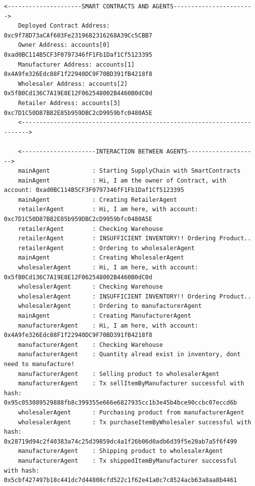 \begin{itemize}
    \vspace{.5cm}
    \begin{lstlisting}[caption={Agent Interaction (Scenario 3)},label={Scenario3}, numbers=none, basicstyle=\ttfamily\tiny]
    <---------------------SMART CONTRACTS AND AGENTS----------------------->
    Deployed Contract Address: 0xc9f78D73aCAf603Fe2319682316268A39Cc5CBB7
    Owner Address: accounts[0] 0xad0BC114B5CF3F0797346fF1Fb1Daf1Cf5123395
    Manufacturer Address: accounts[1] 0x4A9fe326Edc88F1f22940DC9F70BD391fB4218f8
    Wholesaler Address: accounts[2] 0x5fB0Cd136C7A19E8E12F062548002B4460B0dC0d
    Retailer Address: accounts[3] 0xc7D1C50D87B82E85b959DBC2cD9959bfc0480A5E
    <------------------------------------------------------------------------>
    
    <---------------------INTERACTION BETWEEN AGENTS-------------------->
    mainAgent            : Starting SupplyChain with SmartContracts
    mainAgent            : Hi, I am the owner of Contract, with account: 0xad0BC114B5CF3F0797346fF1Fb1Daf1Cf5123395
    mainAgent            : Creating RetailerAgent
    retailerAgent        : Hi, I am here, with account: 0xc7D1C50D87B82E85b959DBC2cD9959bfc0480A5E
    retailerAgent        : Checking Warehouse
    retailerAgent        : INSUFFICIENT INVENTORY!! Ordering Product..
    retailerAgent        : Ordering to wholesalerAgent
    mainAgent            : Creating WholesalerAgent
    wholesalerAgent      : Hi, I am here, with account: 0x5fB0Cd136C7A19E8E12F062548002B4460B0dC0d
    wholesalerAgent      : Checking Warehouse
    wholesalerAgent      : INSUFFICIENT INVENTORY!! Ordering Product..
    wholesalerAgent      : Ordering to manufacturerAgent
    mainAgent            : Creating ManufacturerAgent
    manufacturerAgent    : Hi, I am here, with account: 0x4A9fe326Edc88F1f22940DC9F70BD391fB4218f8
    manufacturerAgent    : Checking Warehouse
    manufacturerAgent    : Quantity alread exist in inventory, dont need to manufacture!
    manufacturerAgent    : Selling product to wholesalerAgent
    manufacturerAgent    : Tx sellItemByManufacturer successful with hash: 0x95c053089529888fb8c399355e666e6827935cc1b3e45b4bce90ccbc07eccd6b
    wholesalerAgent      : Purchasing product from manufacturerAgent
    wholesalerAgent      : Tx purchaseItemByWholesaler successful with hash: 0x28719d94c2f40383a74c25d39859dc4a1f26b06d0adb6d39f5e20ab7a5f6f499
    manufacturerAgent    : Shipping product to wholesalerAgent
    manufacturerAgent    : Tx shippedItemByManufacturer successful with hash: 0x5cbf427497b18c441dc7d44808cfd522c1f62e41a0c7c8524acb63a8aa8b4461

\end{lstlisting}
\end{itemize}
